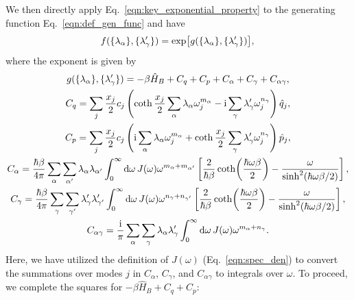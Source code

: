 \documentclass[preprint,aip,jcp]{revtex4-2}
\newcommand{\im}{\textup{i}}
\begin{document}
We then directly apply Eq.~\ref{eqn:key_exponential_property} to the generating function Eq.~\ref{eqn:def_gen_func} and have 
\begin{equation}\label{eqn:expo_g}
    f(\{\lambda_{\alpha}\}, \{\lambda_{\gamma}'\}) = \exp[g(\{\lambda_{\alpha}\}, \{\lambda_{\gamma}'\})], \\
\end{equation}
where the exponent is given by
\begin{gather}
    g(\{\lambda_{\alpha}\}, \{\lambda_{\gamma}'\}) = -\beta \hat{H}_B + C_{q} + C_{p} + C_{\alpha} + C_{\gamma} + C_{\alpha \gamma}, \\
    C_{q} = \sum_j \frac{x_j}{2} c_j \left(\coth\frac{x_j}{2}\sum_{\alpha} \lambda_{\alpha} \omega_j^{m_{\alpha}} - \im \sum_{\gamma} \lambda_{\gamma}' \omega_j^{n_{\gamma}} \right) \hat{q}_j, \\
    C_{p} = \sum_j \frac{x_j}{2} c_j \left(\im\sum_{\alpha} \lambda_{\alpha} \omega_j^{m_{\alpha}} +  \coth\frac{x_j}{2} \sum_{\gamma} \lambda_{\gamma}' \omega_j^{n_{\gamma}} \right) \hat{p}_j, \\
    C_{\alpha} = \frac{\hbar\beta}{4\pi} \sum_{\alpha} \sum_{\alpha'} \lambda_{\alpha} \lambda_{\alpha'} \int_{0}^{\infty}\dd{\omega} J(\omega) \omega^{m_{\alpha} + m_{\alpha'}}\left[\frac{2}{\hbar\beta} \coth(\frac{\hbar\omega\beta}{2}) - \frac{\omega}{\sinh^2(\hbar\omega\beta/2)}\right], \\
    C_{\gamma} = \frac{\hbar\beta}{4\pi} \sum_{\gamma} \sum_{\gamma'} \lambda_{\gamma}' \lambda_{\gamma'}' \int_{0}^{\infty}\dd{\omega} J(\omega) \omega^{n_{\gamma} + n_{\gamma'}}\left[\frac{2}{\hbar\beta} \coth(\frac{\hbar\omega\beta}{2}) - \frac{\omega}{\sinh^2(\hbar\omega\beta/2)}\right], \\
    C_{\alpha\gamma} = \frac{\im}{\pi} \sum_{\alpha} \sum_{\gamma} \lambda_{\alpha} \lambda_{\gamma}' \int_{0}^{\infty} \dd{\omega} J(\omega) \omega^{m_{\alpha} + n_{\gamma}}.
\end{gather}
Here, we have utilized the definition of $J(\omega)$ (Eq.~\ref{eqn:spec_den}) to convert the summations over modes $j$ in $C_{\alpha}$, $C_{\gamma}$, and $C_{\alpha\gamma}$ to integrals over $\omega$. To proceed, we complete the squares for $-\beta \hat{H}_B + C_q + C_p$: 
\end{document}
